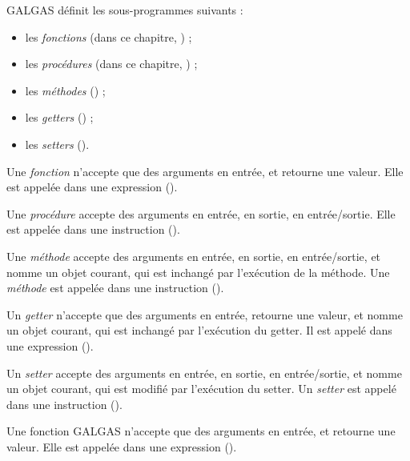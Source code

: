 



GALGAS définit les sous-programmes suivants :
\begin{itemize}
  \item les \emph{fonctions} (dans ce chapitre, ) ;
  \item les \emph{procédures} (dans ce chapitre, ) ;
  \item les \emph{méthodes} () ;
  \item les \emph{getters} () ;
  \item les \emph{setters} ().
\end{itemize}

Une \emph{fonction} n'accepte que des arguments en entrée, et retourne une valeur. Elle est appelée dans une expression ().

Une \emph{procédure} accepte des arguments en entrée, en sortie, en entrée/sortie. Elle est appelée dans une instruction ().

Une \emph{méthode} accepte des arguments en entrée, en sortie, en entrée/sortie, et nomme un objet courant, qui est inchangé par l'exécution de la méthode. Une \emph{méthode} est appelée dans une instruction ().

Un \emph{getter} n'accepte que des arguments en entrée, retourne une valeur, et nomme un objet courant, qui est inchangé par l'exécution du getter. Il est appelé dans une expression ().

Un \emph{setter} accepte des arguments en entrée, en sortie, en entrée/sortie, et nomme un objet courant, qui est modifié par l'exécution du setter. Un \emph{setter} est appelé dans une instruction ().







Une fonction GALGAS n'accepte que des arguments en entrée, et retourne une valeur. Elle est appelée dans une expression ().

